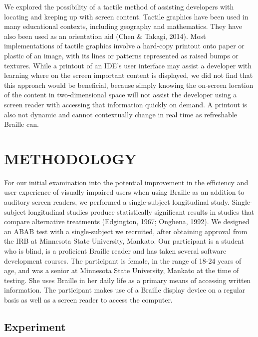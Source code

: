 \documentclass[11.5pt]{sig-alternate} %
\begin{document}
\begin{large}
We explored the possibility of a tactile method of assisting developers with locating and keeping up with screen content. Tactile graphics have been used in many educational contexts, including geography and mathematics. They have also been used as an orientation aid (Chen \& Takagi, 2014). Most implementations of tactile graphics involve a hard-copy printout onto paper or plastic of an image, with its lines or patterns represented as raised bumps or textures. While a printout of an IDE’s user interface may assist a developer with learning where on the screen important content is displayed, we did not find that this approach would be beneficial, because simply knowing the on-screen location of the content in two-dimensional space will not assist the developer using a screen reader with accessing that information quickly on demand. A printout is also not dynamic and cannot contextually change in real time as refreshable Braille can.

\section*{METHODOLOGY}

For our initial examination into the potential improvement in the efficiency and user experience of visually impaired users when using Braille as an addition to auditory screen readers, we performed a single-subject longitudinal study. Single-subject longitudinal studies produce statistically significant results in studies that compare alternative treatments (Edgington, 1967; Onghena, 1992). We designed an ABAB test with a single-subject we recruited, after obtaining approval from the IRB at Minnesota State University, Mankato. Our participant is a student who is blind, is a proficient Braille reader and has taken several software development courses. The participant is female, in the range of 18-24 years of age, and was a senior at Minnesota State University, Mankato at the time of testing. She uses Braille in her daily life as a primary means of accessing written information. The participant makes use of a Braille display device on a regular basis as well as a screen reader to access the computer.

\subsection*{Experiment}


\end{large}
\end{document}
